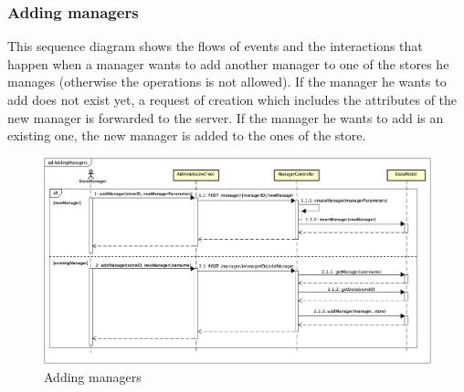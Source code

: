\documentclass[a4paper,oneside,11pt]{book}
\begin{document}
    \subsubsection{Adding managers}
    This sequence diagram shows the flows of events and the interactions that happen when a manager wants to add another manager to one of the stores he manages (otherwise the operations is not allowed). If the manager he wants to add does not exist yet, a request of creation which includes the attributes of the new manager is forwarded to the server. If the manager he wants to add is an existing one, the new manager is added to the ones of the store.
    \begin{figure}[H]
        \centering
        \includegraphics[width=\textwidth, height=\textheight, keepaspectratio]{pictures/sequence_diagrams/adding_managers}
        \caption{Adding managers}
        \label{figure:adding_managers}
    \end{figure}
    
    \newpage
\end{document}
